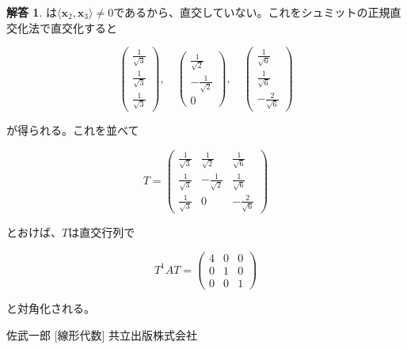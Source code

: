 \documentclass[dvipdfmx,autodetect-engine]{jsarticle}
\theoremstyle{definition}
\newtheorem*{Answer*}{解答}
\begin{document}
{\begin{Answer*}
は$\langle \bm{x}_2, \bm{x}_3 \rangle \neq 0$であるから、直交していない。これをシュミットの正規直交化法で直交化すると

$$
\begin{pmatrix}
\frac{1}{\sqrt{3}} \\[1.5ex]
\frac{1}{\sqrt{3}} \\[1.5ex]
\frac{1}{\sqrt{3}}
\end{pmatrix}, \quad \begin{pmatrix}
\frac{1}{\sqrt{2}} \\[1.5ex]
-\frac{1}{\sqrt{2}} \\[1.5ex]
0
\end{pmatrix}, \quad \begin{pmatrix}
\frac{1}{\sqrt{6}} \\[1.5ex]
\frac{1}{\sqrt{6}} \\[1.5ex]
- \frac{2}{\sqrt{6}}
\end{pmatrix}
$$

が得られる。これを並べて

$$
T = \begin{pmatrix}
\frac{1}{\sqrt{3}} & \frac{1}{\sqrt{2}} & \frac{1}{\sqrt{6}} \\[1.5ex]
\frac{1}{\sqrt{3}} & - \frac{1}{\sqrt{2}} & \frac{1}{\sqrt{6}} \\[1.5ex]
\frac{1}{\sqrt{3}} & 0 & - \frac{2}{\sqrt{6}}
\end{pmatrix}
$$

とおけば、$T$は直交行列で

$$
T^1AT = \begin{pmatrix}
4 & 0 & 0 \\
0 & 1 & 0 \\
0 & 0 & 1
\end{pmatrix}
$$

と対角化される。

\end{Answer*}
}



\begin{thebibliography}{n}
 佐武一郎 [線形代数] 共立出版株式会社
\end{thebibliography}
\end{document}
